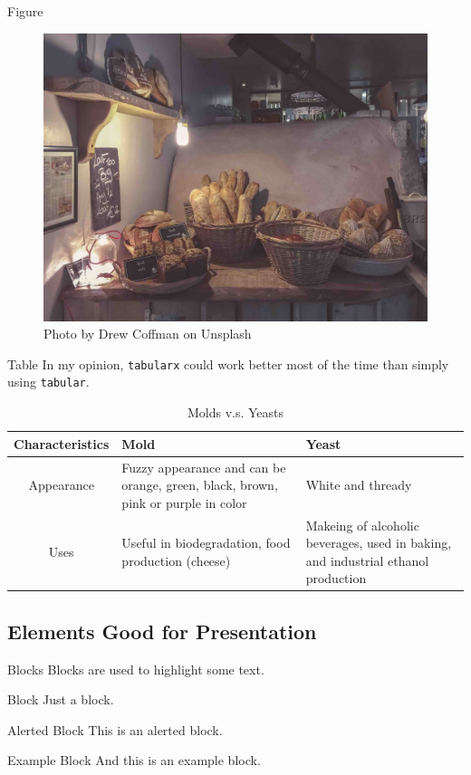 \documentclass[10pt]{beamer}
\begin{document}
\begin{frame}{Figure}
  \begin{figure}
    \centering
    \includegraphics[width=.7\linewidth]{images/drew-coffman-Azli_kcxRNE-unsplash.jpg}
    \caption{Photo by Drew Coffman on Unsplash}
    \label{fig:breads-by-drew-coffman}
  \end{figure}
\end{frame}

\begin{frame}{Table}
  In my opinion, \texttt{tabularx} could work better most of the time than simply using \texttt{tabular}.
  \begin{table}
    \centering
    \begin{tabularx}{\textwidth}{|c|X|X|}
      \hline
      \textbf{Characteristics} & \textbf{Mold} & \textbf{Yeast} \\ \hline\hline
      Appearance
      & Fuzzy appearance and can be orange, green, black, brown, pink or purple in color
      & White and thready \\ \hline
      Uses
      & Useful in biodegradation, food production (cheese)
      & Makeing of alcoholic beverages, used in baking, and industrial ethanol production \\ \hline
    \end{tabularx}
    \caption{Molds v.s. Yeasts}
    \label{tab:molds-vs-yeasts}
  \end{table}
\end{frame}

\subsection{Elements Good for Presentation}

\begin{frame}{Blocks}
  Blocks are used to highlight some text.
  \begin{block}{Block}
    Just a block.
  \end{block}
  \begin{alertblock}{Alerted Block}
    This is an alerted block.
  \end{alertblock}
  \begin{exampleblock}{Example Block}
    And this is an example block.
  \end{exampleblock}
\end{frame}
\end{document}
